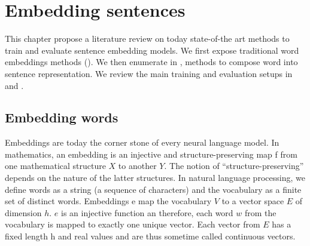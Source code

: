 \setchapterpreamble[u]{\margintoc}
\chapter{Embedding sentences}



This chapter propose a literature review on today state-of-the art methods to train and evaluate sentence embedding models. We first expose traditional word embeddings methods (). We then enumerate in , methods to compose word into sentence representation. We review the main training and evaluation setups in  and .

\section{Embedding words}

Embeddings are today the corner stone of every neural language model. In mathematics, an embedding is an injective and structure-preserving map f from one mathematical structure $X$ to another $Y$. The notion of “structure-preserving” depends on the nature of the latter structures. In natural language processing, we define words as a string (a sequence of characters) and the vocabulary as a finite set of distinct words. Embeddings e map the vocabulary $V$ to a vector space $E$ of dimension $h$. $e$ is an injective function an therefore, each word $w$ from the vocabulary is mapped to exactly one unique vector. Each vector from $E$ has a fixed length h and real values and are thus sometime called continuous vectors. 

